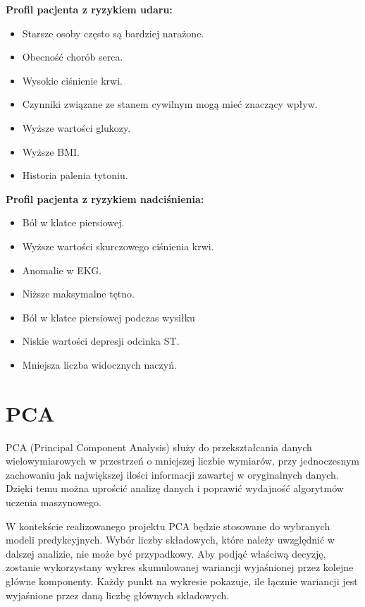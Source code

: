 \documentclass[onecolumn,12pt]{article}
\begin{document}
\vspace{8pt}
\noindent
\textbf{Profil pacjenta z ryzykiem udaru:}
\begin{itemize}
    \itemsep0em
    \item Starsze osoby często są bardziej narażone.
    \item Obecność chorób serca.
    \item Wysokie ciśnienie krwi.
    \item Czynniki związane ze stanem cywilnym mogą mieć znaczący wpływ.
    \item Wyższe wartości glukozy.
    \item Wyższe BMI.
    \item Historia palenia tytoniu.
\end{itemize}

\vspace{8pt}
\noindent
\textbf{Profil pacjenta z ryzykiem nadciśnienia:}
\begin{itemize}
    \itemsep0em
    \item Ból w klatce piersiowej.
    \item Wyższe wartości skurczowego ciśnienia krwi.
    \item Anomalie w EKG.
    \item Niższe maksymalne tętno.
    \item Ból w klatce piersiowej podczas wysiłku
    \item Niskie wartości depresji odcinka ST.
    \item Mniejsza liczba widocznych naczyń.
\end{itemize}



\newpage

\section{PCA}
\noindent 
PCA (Principal Component Analysis) służy do przekształcania danych wielowymiarowych w przestrzeń o mniejszej liczbie wymiarów, przy jednoczesnym zachowaniu jak największej ilości informacji zawartej w oryginalnych danych. Dzięki temu można uprościć analizę danych i poprawić wydajność algorytmów uczenia maszynowego.

\vspace{8pt}
\noindent 
W kontekście realizowanego projektu PCA będzie stosowane do wybranych modeli predykcyjnych. Wybór liczby składowych, które należy uwzględnić w dalszej analizie, nie może być przypadkowy. Aby podjąć właściwą decyzję, zostanie wykorzystany wykres skumulowanej wariancji wyjaśnionej przez kolejne główne komponenty. Każdy punkt na wykresie pokazuje, ile łącznie wariancji jest wyjaśnione przez daną liczbę głównych składowych. 
\end{document}

